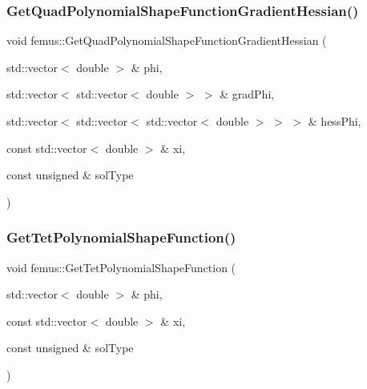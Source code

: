 \subsubsection{\texorpdfstring{Get\+Quad\+Polynomial\+Shape\+Function\+Gradient\+Hessian()}{GetQuadPolynomialShapeFunctionGradientHessian()}}
{\footnotesize\ttfamily void femus\+::\+Get\+Quad\+Polynomial\+Shape\+Function\+Gradient\+Hessian (\begin{DoxyParamCaption}\item[{std\+::vector$<$ double $>$ \&}]{phi,  }\item[{std\+::vector$<$ std\+::vector$<$ double $>$ $>$ \&}]{grad\+Phi,  }\item[{std\+::vector$<$ std\+::vector$<$ std\+::vector$<$ double $>$ $>$ $>$ \&}]{hess\+Phi,  }\item[{const std\+::vector$<$ double $>$ \&}]{xi,  }\item[{const unsigned \&}]{sol\+Type }\end{DoxyParamCaption})}

\mbox{\label{namespacefemus_a74ed9e79d7eb35e7c4054a29b08ea878}} 
\subsubsection{\texorpdfstring{Get\+Tet\+Polynomial\+Shape\+Function()}{GetTetPolynomialShapeFunction()}}
{\footnotesize\ttfamily void femus\+::\+Get\+Tet\+Polynomial\+Shape\+Function (\begin{DoxyParamCaption}\item[{std\+::vector$<$ double $>$ \&}]{phi,  }\item[{const std\+::vector$<$ double $>$ \&}]{xi,  }\item[{const unsigned \&}]{sol\+Type }\end{DoxyParamCaption})}

\mbox{\label{namespacefemus_a05759cf7e10dcbfba9ada7036499b5f7}} 
